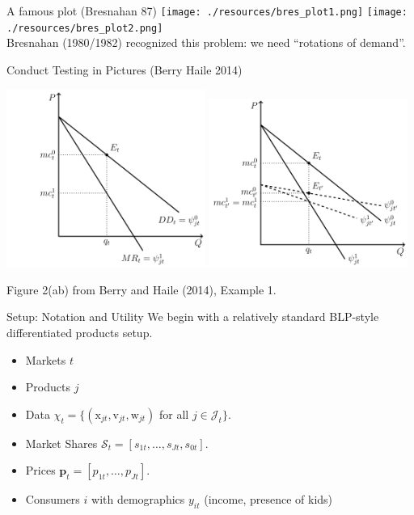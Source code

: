 \documentclass[xcolor=pdftex,dvipsnames,table,mathserif,aspectratio=169]{beamer}
\begin{document}
\begin{frame}{A famous plot (Bresnahan 87)}
\texttt{[image: ./resources/bres\_plot1.png]}
\texttt{[image: ./resources/bres\_plot2.png]}\\
Bresnahan (1980/1982) recognized this problem: we need ``rotations of demand''.
\end{frame}


\begin{frame}[plain]{Conduct Testing in Pictures (Berry Haile 2014)}
\begin{center}
\includegraphics[width = 6.5cm]{resources/berryhaile1.png}
\includegraphics[width = 6.5cm]{resources/berryhaile2.png}
\end{center}
\small{Figure 2(ab) from Berry and Haile (2014), Example 1.}
\end{frame}




\begin{frame}{Setup: Notation and Utility}
We begin with a relatively standard BLP-style differentiated products setup.\\

\begin{itemize}
    \item Markets $t$
    \item Products $j$
    \item Data $\chi_t = \{(\textrm{x}_{jt},\textrm{v}_{jt},\textrm{w}_{jt})$ for all $j \in \mathcal{J}_t\}$.
    \item Market Shares $\mathcal{S}_t = [s_{1t}, \ldots, s_{Jt}, s_{0t}]$.
    \item Prices $\mathbf{p}_t = [p_{1t}, \ldots, p_{Jt}]$.
    \item Consumers $i$ with demographics $y_{it}$ (income, presence of kids)
\end{itemize}
\end{frame}
\end{document}
